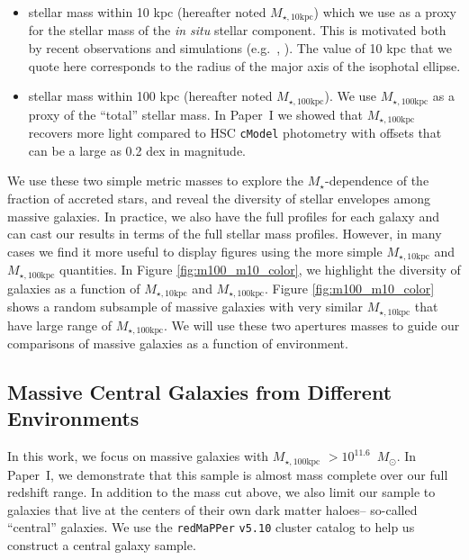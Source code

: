 \documentclass[a4paper,fleqn,usenatbib]{mnras}
\def\msun{$M_\odot$}
\def\redm{\texttt{redMaPPer}}
\def\cmodel{\texttt{cModel}}
\def\mstar{{$M_{\star}$}}
\def\minn{{$M_{\star,10\mathrm{kpc}}$}}
\def\mtot{{$M_{\star,100\mathrm{kpc}}$}}
\begin{document}
    \begin{itemize}
    
        \item stellar mass within 10 kpc (hereafter noted \minn{}) which we use 
            as a proxy for the stellar mass of the \textit{in situ} stellar 
            component. 
            This is motivated both by recent observations and simulations 
            (e.g.~\citealt{vanDokkum2010}, \citealt{RodriguezGomez2016}). 
            The value of 10 kpc that we quote here corresponds to the radius of the 
            major axis of the isophotal ellipse.
            
        \item stellar mass within 100 kpc (hereafter noted \mtot{}). 
            We use \mtot{} as a proxy of the ``total'' stellar mass. 
            In Paper~I we showed that \mtot{} recovers more light compared to 
            HSC \cmodel{} photometry with offsets that can be a large as 0.2 dex 
            in magnitude.        
               
   \end{itemize}
   
   We use these two simple metric masses to explore the \mstar{}-dependence of the 
   fraction of accreted stars, and reveal the diversity of stellar envelopes among 
   massive galaxies. 
   In practice, we also have the full profiles for each galaxy and can cast our 
   results in terms of the full stellar mass profiles. 
   However, in many cases we find it more useful to display figures using the more 
   simple \minn{} and \mtot{} quantities. 
   In Figure \ref{fig:m100_m10_color}, we highlight the diversity of galaxies as a 
   function of \minn{} and \mtot{}. 
   Figure \ref{fig:m100_m10_color} shows a random subsample of massive galaxies with 
   very similar \minn{} that have large range of \mtot{}. 
   We will use these two apertures masses to guide our comparisons of massive galaxies 
   as a function of environment.  
    
\subsection{Massive Central Galaxies from Different Environments}
    \label{ssec:cen}
         
    In this work, we focus on massive galaxies with \mtot{} $>10^{11.6}$~\msun{}. 
    In Paper~I, we demonstrate that this sample is almost mass complete over our full 
    redshift range. 
    In addition to the mass cut above, we also limit our sample to galaxies that live 
    at the centers of their own dark matter haloes-- so-called ``central'' galaxies. 
    We use the \redm{} \texttt{v5.10} \citep{Rykoff2014, Rozo2015b} cluster catalog 
    to help us construct a central galaxy sample.
    
\end{document}
